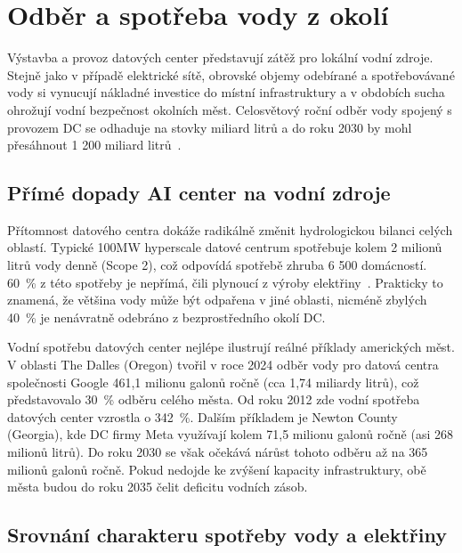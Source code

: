 \section{Odběr a spotřeba vody z okolí}
\label{sec:voda_dopady}

Výstavba a provoz datových center představují zátěž pro lokální vodní zdroje. Stejně jako v případě elektrické sítě, obrovské objemy odebírané a spotřebovávané vody si vynucují nákladné investice do místní infrastruktury a v obdobích sucha ohrožují vodní bezpečnost okolních měst. Celosvětový roční odběr vody spojený s provozem DC se odhaduje na stovky miliard litrů a do roku 2030 by mohl přesáhnout 1 200 miliard litrů~\cite[s.~242]{international_energy_agency_iea_energy_2025}.

\subsection{Přímé dopady AI center na vodní zdroje}
\label{subsec:voda_dopady_prime}

Přítomnost datového centra dokáže radikálně změnit hydrologickou bilanci celých oblastí. Typické 100MW hyperscale datové centrum spotřebuje kolem 2 milionů litrů vody denně (Scope 2), což odpovídá spotřebě zhruba 6 500 domácností. 60~\% z této spotřeby je nepřímá, čili plynoucí z výroby elektřiny~\cite{international_energy_agency_iea_energy_2025}. Prakticky to znamená, že většina vody může být odpařena v jiné oblasti, nicméně zbylých 40~\% je nenávratně odebráno z bezprostředního okolí DC.

Vodní spotřebu datových center nejlépe ilustrují reálné příklady amerických měst. V oblasti The Dalles (Oregon) tvořil v roce 2024 odběr vody pro datová centra společnosti Google 461,1 milionu galonů ročně (cca 1,74 miliardy litrů), což představovalo 30~\% odběru celého města. Od roku 2012 zde vodní spotřeba datových center vzrostla o 342~\%. Dalším příkladem je Newton County (Georgia), kde DC firmy Meta využívají kolem 71,5 milionu galonů ročně (asi 268 milionů litrů). Do roku 2030 se však očekává nárůst tohoto odběru až na 365 milionů galonů ročně. Pokud nedojde ke zvýšení kapacity infrastruktury, obě města budou do roku 2035 čelit deficitu vodních zásob.~\cite[s.~4--5]{shah_four_2026}

\subsection{Srovnání charakteru spotřeby vody a elektřiny}
\label{sec:voda_elektrina_srovnani}

